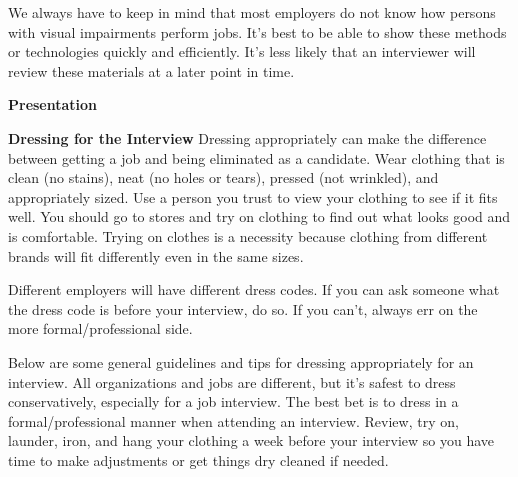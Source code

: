We always have to keep in mind that most employers do not know how persons with visual impairments perform jobs. It's best to be able to show these methods or technologies quickly and efficiently. It's less likely that an interviewer will review these materials at a later point in time.

\textbf{Presentation}

\textbf{Dressing for the Interview}
\break Dressing appropriately can make the difference between getting a job and being eliminated as a candidate. Wear clothing that is clean (no stains), neat (no holes or tears), pressed (not wrinkled), and appropriately sized. Use a person you trust to view your clothing to see if it fits well. You should go to stores and try on clothing to find out what looks good and is comfortable. Trying on clothes is a necessity because clothing from different brands will fit differently even in the same sizes.

Different employers will have different dress codes. If you can ask someone what the dress code is before your interview, do so. If you can't, always err on the more formal/professional side.

Below are some general guidelines and tips for dressing appropriately for an interview. All organizations and jobs are different, but it's safest to dress conservatively, especially for a job interview. The best bet is to dress in a formal/professional manner when attending an interview. Review, try on, launder, iron, and hang your clothing a week before your interview so you have time to make adjustments or get things dry cleaned if needed.

